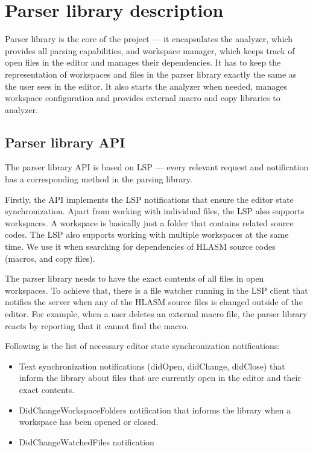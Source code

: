 \section{Parser library description}

Parser library is the core of the project --- it encapsulates the analyzer, which provides all parsing capabilities, and workspace manager, which keeps track of open files in the editor and manages their dependencies. It has to keep the representation of workspaces and files in the parser library exactly the same as the user sees in the editor. It also starts the analyzer when needed, manages workspace configuration and provides external macro and copy libraries to analyzer.

\subsection{Parser library API}
The parser library API is based on LSP --- every relevant request and notification has a corresponding method in the parsing library.

Firstly, the API implements the LSP notifications that ensure the editor state synchronization. Apart from working with individual files, the LSP also supports workspaces. A workspace is basically just a folder that contains related source codes. The LSP also supports working with multiple workspaces at the same time. We use it when searching for dependencies of HLASM source codes (macros, and copy files).

The parser library needs to have the exact contents of all files in open workspaces. To achieve that, there is a file watcher running in the LSP client that notifies the server when any of the HLASM source files is changed outside of the editor. For example, when a user deletes an external macro file, the parser library reacts by reporting that it cannot find the macro.

Following is the list of necessary editor state synchronization notifications:
\begin{itemize}
	\item Text synchronization notifications (didOpen, didChange, didClose) that inform the library about files that are currently open in the editor and their exact contents.
	\item DidChangeWorkspaceFolders notification that informs the library when a workspace has been opened or closed.
	\item DidChangeWatchedFiles notification
\end{itemize}

